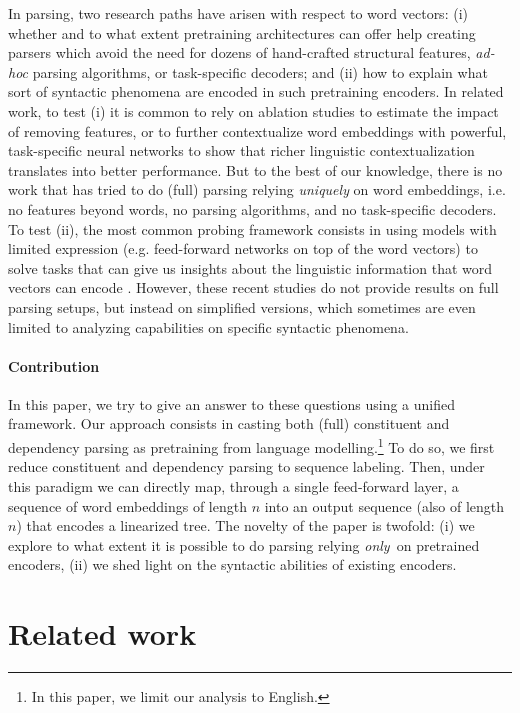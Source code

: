 \documentclass[letterpaper]{article} %
\begin{document}
In parsing, two research paths have arisen with respect to word vectors:
(i) whether and to what extent pretraining architectures can offer help creating parsers which avoid the need for dozens of hand-crafted structural features, \emph{ad-hoc} parsing algorithms, or task-specific decoders; and (ii) how to explain what sort of syntactic phenomena are encoded in such pretraining encoders.
In related work, to test (i) it is common to rely on ablation studies to estimate the impact of  removing features, or to further contextualize word embeddings with powerful, task-specific neural networks to show that richer linguistic contextualization translates into better performance. But to the best of our knowledge, there is no work that has tried to do (full) parsing relying \emph{uniquely} on word embeddings, i.e. no features beyond words, no parsing algorithms, and no  task-specific decoders. To test (ii), the most common probing framework consists in using models with limited expression (e.g. feed-forward networks on top of the word vectors) to solve tasks that can give us insights about the linguistic information that word vectors can encode \cite{tenney2018you}. However, these recent studies do not provide results on full parsing setups, but instead on simplified versions, which sometimes are even limited to analyzing capabilities on specific syntactic phenomena.

\paragraph{Contribution}
In this paper, we try to give an answer to these questions using a unified framework. Our approach consists in casting both (full) constituent and dependency parsing as pretraining from language modelling.\footnote{In this paper, we limit our analysis to English.} To do so, we first reduce constituent and dependency parsing to sequence labeling. Then, under this paradigm we can directly map, through a single feed-forward layer, a sequence of word embeddings of length $n$ into an output sequence (also of length $n$) that encodes a linearized tree. The novelty of the paper is twofold: (i) we explore to what extent it is possible to do parsing relying {\em only}~on pretrained encoders, (ii) we shed light on the syntactic abilities of existing encoders.


\section{Related work}\label{section-related-work}
\end{document}
